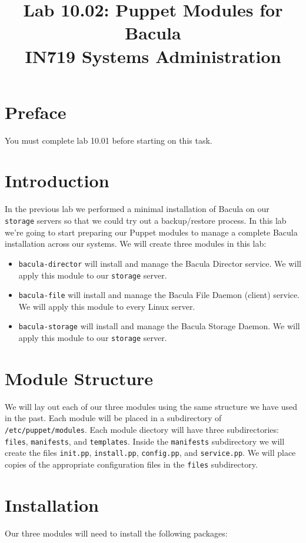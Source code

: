 \documentclass{article}   	%
\title{Lab 10.02:  Puppet Modules for Bacula\\ IN719 Systems Administration}
\date{}							%
\begin{document}
\maketitle

\section*{Preface}
You must complete lab 10.01 before starting on this task. 

\section*{Introduction}
In the previous lab we performed a minimal installation of Bacula on our \texttt{storage} servers so that we could try out a backup/restore process. In this lab we're going to start preparing our Puppet modules to manage a complete Bacula installation across our systems. We will create three modules in this lab:

\begin{itemize}
	\item \texttt{bacula-director} will install and manage the Bacula Director service.  We will apply this module to our \texttt{storage} server.
	\item \texttt{bacula-file} will install and manage the Bacula File Daemon (client) service. We will apply this module to every Linux server.
	\item \texttt{bacula-storage} will install and manage the Bacula Storage Daemon.  We will apply this module to our \texttt{storage} server.
\end{itemize}

\section{Module Structure}
We will lay out each of our three modules using the same structure we have used in the past.  Each module will be placed in a subdirectory of \texttt{/etc/puppet/modules}.  Each module diectory will have three subdirectories: \texttt{files}, \texttt{manifests}, and \texttt{templates}.  Inside the \texttt{manifests} subdirectory we will create the files \texttt{init.pp}, \texttt{install.pp}, \texttt{config.pp}, and \texttt{service.pp}. We will place copies of the appropriate configuration files in the \texttt{files} subdirectory.

\section{Installation}
Our three modules will need to install the following packages:
\end{document}
